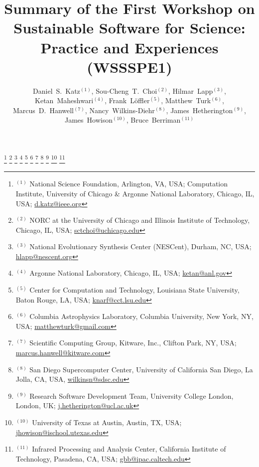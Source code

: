 \documentclass[11pt, oneside]{amsart}
\newcommand{\note}[1]{ {\textcolor{red}    { #1 }}}
\begin{document}
\title[]{Summary of the First Workshop on Sustainable Software for Science: Practice and Experiences (WSSSPE1)}

\author{Daniel~S.~Katz$^{(1)}$,
Sou-Cheng~T.~Choi$^{(2)}$,
Hilmar~Lapp$^{(3)}$,
Ketan~Maheshwari$^{(4)}$,
Frank~Löffler$^{(5)}$,
Matthew~Turk$^{(6)}$,
Marcus~D.~Hanwell$^{(7)}$,
Nancy~Wilkins-Diehr$^{(8)}$,
James~Hetherington$^{(9)}$,
James~Howison$^{(10)}$,
Bruce~Berriman$^{(11)}$
}

\thanks{{}$^{(1)}$ National Science Foundation, Arlington, VA, USA; Computation Institute, University of Chicago \& Argonne National Laboratory, Chicago, IL, USA; \url{d.katz@ieee.org}}
%
\thanks{{}$^{(2)}$ NORC at the University of Chicago and   Illinois Institute of Technology, Chicago, IL, USA; \url{sctchoi@uchicago.edu}}
%
\thanks{{}$^{(3)}$ National Evolutionary Synthesis Center (NESCent),
  Durham, NC, USA; \url{hlapp@nescent.org}}
%
\thanks{{}$^{(4)}$ Argonne National Laboratory, Chicago, IL, USA; \url{ketan@anl.gov}}
%
\thanks{{}$^{(5)}$ Center for Computation and Technology, Louisiana State University, Baton Rouge, LA, USA; \url{knarf@cct.lsu.edu}}
%
\thanks{{}$^{(6)}$ Columbia Astrophysics Laboratory, Columbia University, New
York, NY, USA; \url{matthewturk@gmail.com}}
%
\thanks{{}$^{(7)}$ Scientific Computing Group, Kitware, Inc.,  Clifton Park, NY, USA; \url{marcus.hanwell@kitware.com}}
%
\thanks{{}$^{(8)}$ San Diego Supercomputer Center, University of California San Diego, La Jolla, CA, USA, \url{wilkinsn@sdsc.edu}}
%
\thanks{{}$^{(9)}$ Research Software Development Team, University College London, London, UK; \url {j.hetherington@ucl.ac.uk}}
%
\thanks{{}$^{(10)}$ University of Texas at Austin, Austin, TX, USA; \url{jhowison@ischool.utexas.edu}}
%
%
%
\thanks{{}$^{(11)}$ Infrared Processing and Analysis Center, California Institute of Technology, Pasadena, CA, USA; \url{gbb@ipac.caltech.edu}}
%
\end{document}
